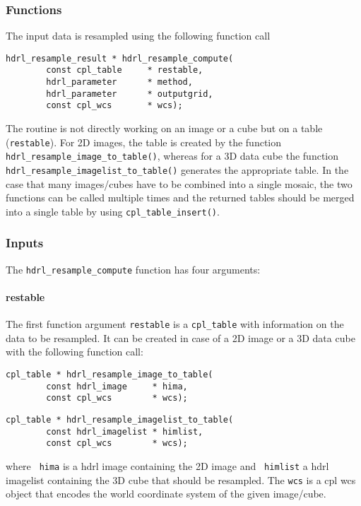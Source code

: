 
\subsubsection{Functions}
The input data is resampled using the following function call
\begin{lstlisting}
hdrl_resample_result * hdrl_resample_compute(
        const cpl_table     * restable,
        hdrl_parameter      * method,
        hdrl_parameter      * outputgrid,
        const cpl_wcs       * wcs);
\end{lstlisting}

The routine is not directly working on an image or a cube but on a table
(\verb+restable+). For 2D images, the table is created by the function
\verb+hdrl_resample_image_to_table()+, whereas for a 3D data cube the
function \verb+hdrl_resample_imagelist_to_table()+ generates the appropriate
table. In the case that many images/cubes have to be combined into a single
mosaic, the two functions can be called multiple times and the returned tables
should be merged into a single table by using \verb+cpl_table_insert()+.

\subsubsection{Inputs}
The \verb+hdrl_resample_compute+ function has four arguments:

\paragraph*{restable}
The first function argument \verb+restable+ is a \verb+cpl_table+ with
information on the data to be resampled.  It can be created in case of a 2D
image or a 3D data cube with the following function call:

\begin{lstlisting}
cpl_table * hdrl_resample_image_to_table(
        const hdrl_image     * hima,
        const cpl_wcs        * wcs);  
\end{lstlisting}

\begin{lstlisting}
cpl_table * hdrl_resample_imagelist_to_table(
        const hdrl_imagelist * himlist,
        const cpl_wcs        * wcs);
\end{lstlisting}

where \verb+ hima+ is a hdrl image containing the 2D image and \verb+ himlist+ a
hdrl imagelist containing the 3D cube that should be resampled. The \verb+wcs+
is a cpl wcs object that encodes the world coordinate system of the given
image/cube. 


